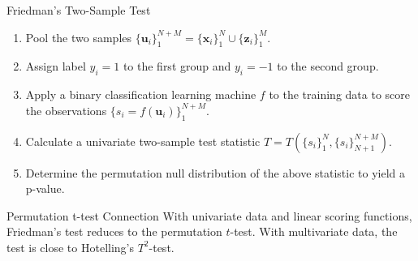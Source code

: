 \documentclass{beamer}
\begin{document}
\begin{frame}{Friedman's Two-Sample Test}
  \begin{enumerate}
  \item Pool the two samples $\{\mathbf{u}_i\}_1^{N+M} =
    \{\mathbf{x}_i\}_1^{N} \cup \{\mathbf{z}_i\}_1^{M}$. \pause
  \item Assign label $y_i = 1$ to the first group and $y_i = -1$ to
    the second group. \pause
  \item Apply a binary classification learning machine $f$ to the training
    data to score the observations $\{s_i =
    f(\mathbf{u}_i)\}_1^{N+M}$. \pause
  \item Calculate a univariate two-sample test statistic $T =
    T(\{s_i\}_1^N,\{s_i\}_{N+1}^{N+M})$. \pause
  \item Determine the permutation null distribution of the above
    statistic to yield a p-value.
  \end{enumerate}  
\end{frame}

\begin{frame}{Permutation t-test Connection}
  With univariate data and linear scoring functions, Friedman's test reduces
  to the permutation $t$-test.  \pause
  \newline
  \newline 
  With multivariate data, the test is close to Hotelling's
  $T^2$-test.
\end{frame}
\end{document}
